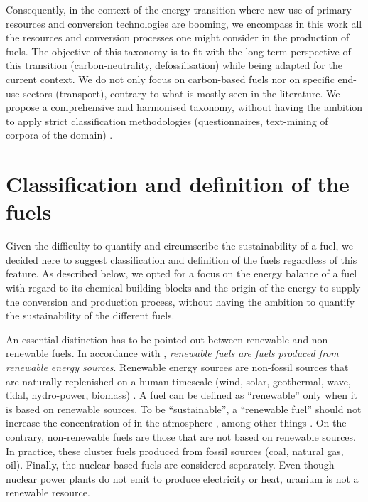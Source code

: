 Consequently, in the context of the energy transition where new use of primary resources and conversion technologies are booming, we encompass in this work all the resources and conversion processes one might consider in the production of fuels. The objective of this taxonomy is to fit with the long-term perspective of this transition (\eg carbon-neutrality, defossilisation) while being adapted for the current context.  We do not only focus on carbon-based fuels nor on specific end-use sectors (\eg transport), contrary to what is mostly seen in the literature. We propose a comprehensive and harmonised taxonomy, without having the ambition to apply strict classification methodologies (\eg questionnaires, text-mining of corpora of the domain) \cite{ncbi_fossilfuel}.  %

\section{Classification and definition of the fuels}
\label{sec:definition}
Given the difficulty to quantify and circumscribe the sustainability of a fuel, we decided here to suggest classification and definition of the fuels regardless of this feature. As described below, we opted for a focus on the energy balance of a fuel with regard to its chemical building blocks and the origin of the energy to supply the conversion and production process, without having the ambition to quantify the sustainability of the different fuels.

An essential distinction has to be pointed out between renewable and non-renewable fuels. In accordance with \cite{eu2003directive}, \textit{renewable fuels are fuels produced from renewable energy sources}. Renewable energy sources are non-fossil sources that are naturally replenished on a human timescale (wind, solar, geothermal, wave, tidal, hydro-power, biomass) \cite{ellabban2014}. A fuel can be defined as ``renewable'' only when it is based on renewable sources. To be ``sustainable'', a ``renewable fuel'' should not increase the concentration of  in the atmosphere \cite{Dincer2020}, among other things \cite{eu_sustainable}.
On the contrary, non-renewable fuels are those that are not based on renewable sources. In practice, these cluster fuels produced from fossil sources (\eg coal, natural gas, oil). 
Finally, the nuclear-based fuels are considered separately. Even though nuclear power plants do not emit  to produce electricity or heat, uranium is not a renewable resource. 

